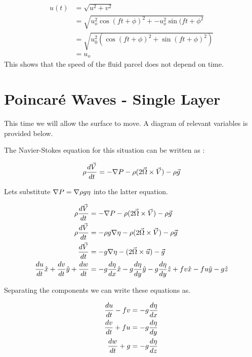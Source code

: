 \begin{align}
	u(t) &= \sqrt{u^2+v^2} \\ 
	& = \sqrt{u_o^2\cos(ft+\phi)^2+-u_o^2\sin(ft+\phi^2} \\
	&=\sqrt{u_0^2(\cos(ft+\phi)^2+\sin(ft+\phi)^2 )} \\ 
	&=u_o
\end{align}
This shows that the speed of the fluid parcel does not depend on time. 


\section{Poincar\'{e} Waves - Single Layer}
This time we will allow the surface to move. A diagram of relevant variables is provided below.

 
The Navier-Stokes equation for this situation can be written as : 

\begin{equation}
 	\rho \frac{d \vec{V}}{dt}= -\nabla P  -\rho(2\vec{\Omega} \times \vec{V})-\rho\vec{g} 
 \end{equation}

Lets substitute $\nabla P=\nabla \rho g \eta$ into the latter equation. 

\begin{align}
	\rho \frac{d \vec{V}}{dt} &= -\nabla P  -\rho(2\vec{\Omega} \times \vec{V})-\rho\vec{g}  \\ 
	\rho \frac{d \vec{V}}{dt} &= -\rho g \nabla \eta  -\rho(2\vec{\Omega} \times \vec{V})-\rho\vec{g}   \\ 
	\frac{d \vec{V}}{dt} &= - g \nabla \eta  -(2\vec{\Omega} \times \vec{u})-\vec{g}  \\ 
	\frac{d u}{dt}\hat{x} + \frac{d v}{dt} \hat{y} +\frac{d w}{dt}&= -g\frac{d \eta}{dx} \hat{x} -g\frac{d \eta}{dy}\hat{y}  -g\frac{d \eta}{dy}\hat{z}+ fv\hat{x} - fu \hat{y}-g\hat{z}
\end{align}

Separating the components we can write these equations as. 

\begin{align}
	\frac{d u}{dt}-fv&=-g\frac{d \eta}{dx} \label{eqn:ns_single} \\
	\frac{d v}{dt}+fu&=-g\frac{d \eta}{dy} \\
	\frac{d w}{dt} +g&= -g\frac{d \eta}{dz}
\end{align}

